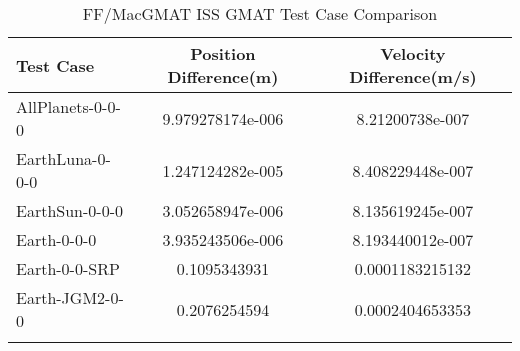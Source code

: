 \begin{table}[htbp!]
\centering
\caption{ FF/MacGMAT ISS GMAT Test Case Comparison}
      \begin{tabular}{lcc}
      \hline\hline
          Test Case & Position Difference(m) & Velocity Difference(m/s) \\
         \hline
         AllPlanets-0-0-0 & 9.979278174e-006 & 8.21200738e-007 \\
         EarthLuna-0-0-0 & 1.247124282e-005 & 8.408229448e-007 \\
         EarthSun-0-0-0 & 3.052658947e-006 & 8.135619245e-007 \\
         Earth-0-0-0 & 3.935243506e-006 & 8.193440012e-007 \\
         Earth-0-0-SRP & 0.1095343931 & 0.0001183215132 \\
         Earth-JGM2-0-0 & 0.2076254594 & 0.0002404653353 \\
      \hline\hline
      \label{Table: ISS GMAT Table} 
\end{tabular}
\end{table}
